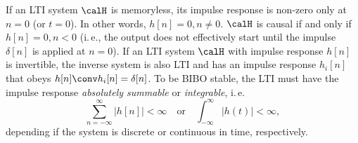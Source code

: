 If an LTI system $\calH$ is memoryless, its impulse response is non-zero only at $n=0$ (or $t=0$). In other words, $h[n]=0, n \ne 0$. $\calH$ is causal if and only if $h[n]=0, n<0$ (i.\,e., the output does not effectively start until the impulse $\delta[n]$ is applied at $n=0$). If an LTI system $\calH$ with impulse response $h[n]$ is invertible, the inverse system is also LTI and has an impulse response $h_i[n]$ that obeys $h[n] \conv h_i[n] = \delta[n]$. To be BIBO stable, the LTI must have the impulse response \emph{absolutely summable} or \emph{integrable}, i.\,e.
\begin{equation}
\sum_{n=-\infty}^{\infty} \lvert h[n]\rvert < \infty\quad\textrm{or}\quad\int_{-\infty}^{\infty} |h(t)| < \infty,
\label{eq:bibo_stable}
\end{equation}
depending if the system is discrete or continuous in time, respectively.

